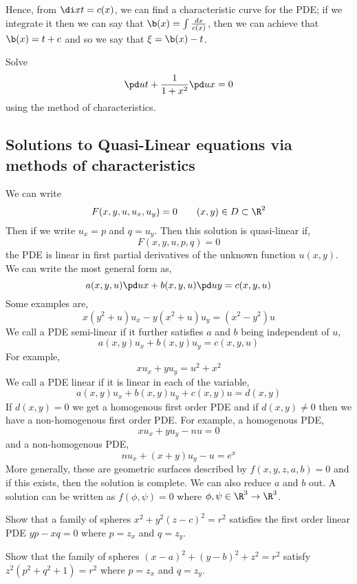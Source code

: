 Hence, from $\di x t = c(x)$, we can find a characteristic curve for the PDE; if we integrate it then we can say that $\b(x) = \int \frac{dx}{c(x)}$, then we can achieve that $\b(x) = t + c$ and so we say that $\xi = \b(x) - t$.

\begin{eg}
  Solve
  $$ \pd u t + \frac{1}{1 + x^2}\pd u x = 0 $$
  using the method of characteristics.
\end{eg}

\subsection{Solutions to Quasi-Linear equations via methods of characteristics}
We can write
$$ F(x, y , u, u_x, u_y) = 0 \qquad (x, y) \in D \subset \R^2$$
Then if we write $u_x = p$ and $q = u_y$. Then this solution is quasi-linear if,
$$ F(x, y, u, p, q) = 0 $$
the PDE is linear in first partial derivatives of the unknown function $u(x, y)$. We can write the most general form as,
$$ a(x, y, u)\pd u x + b(x, y, u)\pd u y = c(x, y, u) $$
Some examples are,
$$ x(y^2 + u)u_x - y(x^2 + u)u_y = (x^2 - y^2)u $$
We call a PDE semi-linear if it further satisfies $a$ and $b$ being independent of $u$,
$$ a(x, y)u_x + b(x, y)u_y = c(x, y, u) $$
For example,
$$ xu_x + yu_y = u^2 + x^2 $$
We call a PDE linear if it is linear in each of the variable,
$$ a(x, y)u_x + b(x, y)u_y + c(x, y)u = d(x, y) $$
If $d(x, y) = 0$ we get a homogenous first order PDE and if $d(x, y) \ne 0$ then we have a non-homogenous first order PDE. For example, a homogenous PDE,
$$ xu_x + yu_y - nu = 0 $$
and a non-homogenous PDE,
$$ nu_x + (x + y)u_y - u = e^x $$
More generally, these are geometric surfaces described by $f(x, y, z, a, b) = 0$ and if this exists, then the solution is complete. We can also reduce $a$ and $b$ out. A solution can be written as $f(\phi, \psi) = 0$ where $\phi, \psi \in \R^3 \to \R^3$.

\begin{eg}
  Show that a family of spheres $x^2 + y^2 (z - c)^2 = r^2$ satisfies the first order linear PDE $yp - xq = 0$ where $p = z_x$ and $q = z_y$.
\end{eg}

\begin{exercise}
  Show that the family of spheres $(x - a)^2 + (y - b)^2 + z^2 = r^2$ satisfy $z^2(p^2 + q^2 + 1) = r^2$ where $p = z_x$ and $q = z_y$.
\end{exercise}

